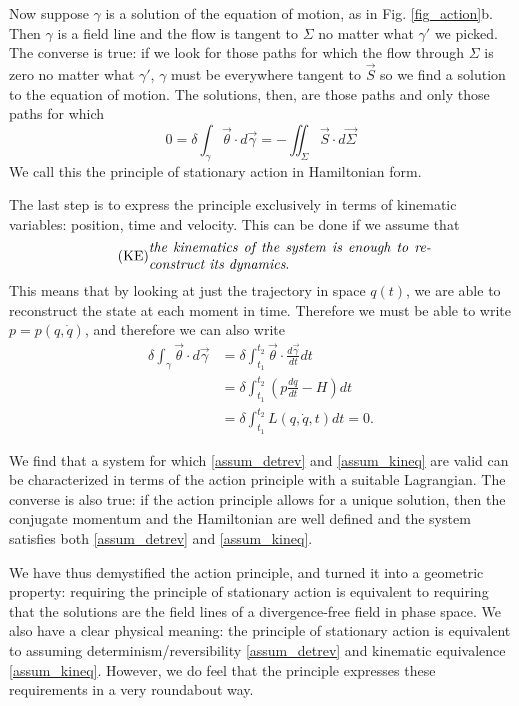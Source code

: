 \documentclass[fleqn,10pt]{wlscirep}
\begin{document}
Now suppose $\gamma$ is a solution of the equation of motion, as in Fig. \ref{fig_action}b. Then $\gamma$ is a field line and the flow is tangent to $\Sigma$ no matter what $\gamma'$ we picked. The converse is true: if we look for those paths for which the flow through $\Sigma$ is zero no matter what $\gamma'$, $\gamma$ must be everywhere tangent to $\vec{S}$ so we find a solution to the equation of motion. The solutions, then, are those paths and only those paths for which
\begin{equation}\label{sdof_stationary_action}
	0 =\delta \int_{\gamma} \vec{\theta} \cdot d\vec{\gamma} = - \iint_{\Sigma} \vec{S} \cdot d\vec{\Sigma} 
\end{equation}
We call this the principle of stationary action in Hamiltonian form.

The last step is to express the principle exclusively in terms of kinematic variables: position, time and velocity. This can be done if we assume that 
\begin{align}\label{assum_kineq}
	\tag*{(KE)}
	\parbox{2.8in}{\emph{the kinematics of the system is enough to reconstruct its dynamics}.}
\end{align}
This means that by looking at just the trajectory in space $q(t)$, we are able to reconstruct the state at each moment in time. Therefore we must be able to write $p=p(q,\dot{q})$, and therefore we can also write
\begin{equation}\label{sdof_Lagrangian}
	\begin{aligned}
		\delta \int_{\gamma} \vec{\theta} \cdot d\vec{\gamma} 
		&= \delta \int^{t_2}_{t_1} \vec{\theta} \cdot \frac{d\vec{\gamma}}{dt} dt \\  
		&= \delta \int^{t_2}_{t_1} \left(p \frac{dq}{dt} - H \right) dt \\
		&= \delta \int^{t_2}_{t_1}L(q, \dot{q}, t) dt = 0.
	\end{aligned}
\end{equation}

We find that a system for which \ref{assum_detrev} and \ref{assum_kineq} are valid can be characterized in terms of the action principle with a suitable Lagrangian. The converse is also true: if the action principle allows for a unique solution, then the conjugate momentum and the Hamiltonian are well defined and the system satisfies both \ref{assum_detrev} and \ref{assum_kineq}.

We have thus demystified the action principle, and turned it into a geometric property: requiring the principle of stationary action is equivalent to requiring that the solutions are the field lines of a divergence-free field in phase space. We also have a clear physical meaning: the principle of stationary action is equivalent to assuming determinism/reversibility \ref{assum_detrev} and kinematic equivalence \ref{assum_kineq}. However, we do feel that the principle expresses these requirements in a very roundabout way.
\end{document}
